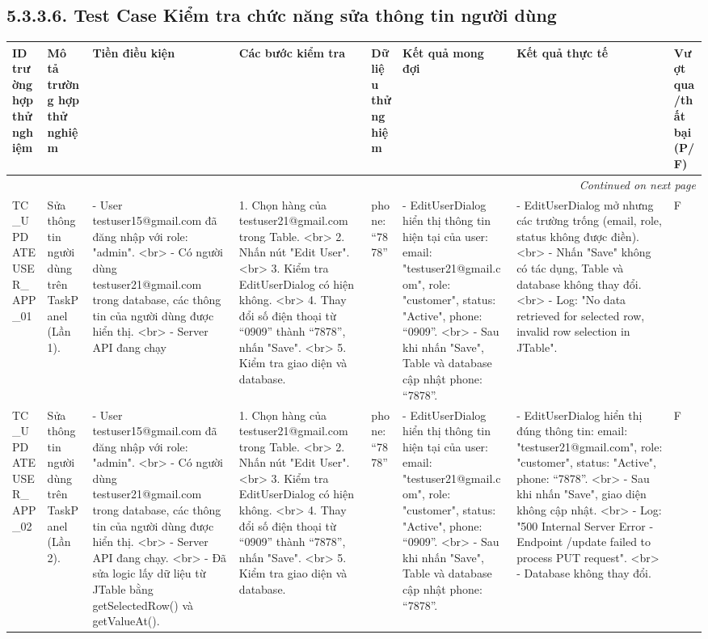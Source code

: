 \documentclass[a4paper,12pt]{article}
\begin{document}
\subsection{5.3.3.6. Test Case Kiểm tra chức năng sửa thông tin người dùng}
\begin{longtable}{|p{2cm}|p{3cm}|p{3cm}|p{4cm}|p{3cm}|p{3cm}|p{3cm}|p{2cm}|}
    \hline
    \textbf{ID trường hợp thử nghiệm} & \textbf{Mô tả trường hợp thử nghiệm} & \textbf{Tiền điều kiện} & \textbf{Các bước kiểm tra} & \textbf{Dữ liệu thử nghiệm} & \textbf{Kết quả mong đợi} & \textbf{Kết quả thực tế} & \textbf{Vượt qua/thất bại (P/F)} \\ \hline
    \endhead
    \hline
    \multicolumn{8}{|r|}{\textit{Continued on next page}} \\
    \hline
    \endfoot
    \hline
    \endlastfoot
    TC_UPDATEUSER_APP_01 & Sửa thông tin người dùng trên TaskPanel (Lần 1). & - User testuser15@gmail.com đã đăng nhập với role: "admin". <br> - Có người dùng testuser21@gmail.com trong database, các thông tin của người dùng được hiển thị. <br> - Server API đang chạy & 1. Chọn hàng của testuser21@gmail.com trong Table. <br> 2. Nhấn nút "Edit User". <br> 3. Kiểm tra EditUserDialog có hiện không. <br> 4. Thay đổi số điện thoại từ “0909” thành “7878”, nhấn "Save". <br> 5. Kiểm tra giao diện và database. & phone: “7878” & - EditUserDialog hiển thị thông tin hiện tại của user: email: "testuser21@gmail.com", role: "customer", status: "Active", phone: “0909”. <br> - Sau khi nhấn "Save", Table và database cập nhật phone: “7878”. & - EditUserDialog mở nhưng các trường trống (email, role, status không được điền). <br> - Nhấn "Save" không có tác dụng, Table và database không thay đổi. <br> - Log: "No data retrieved for selected row, invalid row selection in JTable". & F \\ \hline
    TC_UPDATEUSER_APP_02 & Sửa thông tin người dùng trên TaskPanel (Lần 2). & - User testuser15@gmail.com đã đăng nhập với role: "admin". <br> - Có người dùng testuser21@gmail.com trong database, các thông tin của người dùng được hiển thị. <br> - Server API đang chạy. <br> - Đã sửa logic lấy dữ liệu từ JTable bằng getSelectedRow() và getValueAt(). & 1. Chọn hàng của testuser21@gmail.com trong Table. <br> 2. Nhấn nút "Edit User". <br> 3. Kiểm tra EditUserDialog có hiện không. <br> 4. Thay đổi số điện thoại từ “0909” thành “7878”, nhấn "Save". <br> 5. Kiểm tra giao diện và database. & phone: “7878” & - EditUserDialog hiển thị thông tin hiện tại của user: email: "testuser21@gmail.com", role: "customer", status: "Active", phone: “0909”. <br> - Sau khi nhấn "Save", Table và database cập nhật phone: “7878”. & - EditUserDialog hiển thị đúng thông tin: email: "testuser21@gmail.com", role: "customer", status: "Active", phone: “7878”. <br> - Sau khi nhấn "Save", giao diện không cập nhật. <br> - Log: "500 Internal Server Error - Endpoint /update failed to process PUT request". <br> - Database không thay đổi. & F \\ \hline

\end{longtable}
\end{document}
